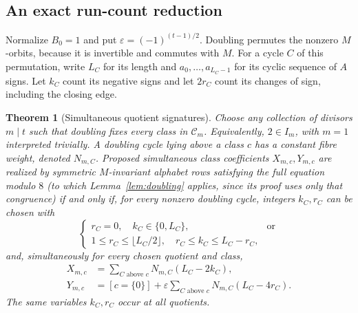 \documentclass[11pt]{article}
\newtheorem{theorem}{Theorem}[section]
\theoremstyle{definition}
\theoremstyle{remark}
\begin{document}
\subsection{An exact run-count reduction}
\label{se-subsec-runs}

Normalize $B_0=1$ and put $\varepsilon=(-1)^{(t-1)/2}$.
Doubling permutes the nonzero $M$-orbits, because it is invertible and
commutes with $M$.  For a cycle $C$ of this permutation, write $L_C$ for
its length and $a_0,\ldots,a_{L_C-1}$ for its cyclic sequence of $A$
signs.  Let $k_C$ count its negative signs and let $2r_C$ count its
changes of sign, including the closing edge.

\begin{theorem}[Simultaneous quotient signatures]
\label{se-thm-runs}
Choose any collection of divisors $m\mid t$ such that doubling fixes
every class in $\mathcal C_m$.  Equivalently, $2\in I_m$, with $m=1$
interpreted trivially.  A doubling cycle lying above a class $c$ has a
constant fibre weight, denoted $N_{m,C}$.
Proposed simultaneous class coefficients $X_{m,c},Y_{m,c}$ are realized
by symmetric $M$-invariant alphabet rows satisfying the full equation
modulo $8$ (to which Lemma~\ref{lem:doubling} applies, since its proof uses
only that congruence) if and only if, for every nonzero doubling cycle, integers
$k_C,r_C$ can be chosen with
\begin{equation}
 \begin{cases}
 r_C=0,\quad k_C\in\{0,L_C\},&\text{or}\\
 1\le r_C\le\lfloor L_C/2\rfloor,
 \quad r_C\le k_C\le L_C-r_C,
 \end{cases}
 \label{se-eq-runbounds}
\end{equation}
and, simultaneously for every chosen quotient and class,
\begin{align}
 X_{m,c}&=\sum_{C\text{ above }c}N_{m,C}(L_C-2k_C),
 \label{se-eq-runs-a}\\
 Y_{m,c}&=[c=\{0\}]+\varepsilon
       \sum_{C\text{ above }c}N_{m,C}(L_C-4r_C).
 \label{se-eq-runs-b}
\end{align}
The same variables $k_C,r_C$ occur at all quotients.
\end{theorem}
\end{document}

